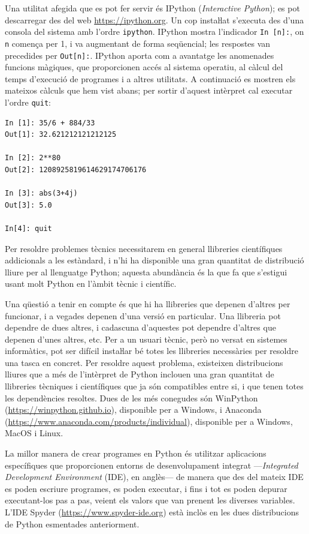 Una utilitat afegida que es pot fer servir és IPython (\textit{Interactive Python}); es pot descarregar des del web \href{https://ipython.org/}{https:/\!\!/ipython.org}. Un cop instaŀlat s'executa des d'una consola del sistema amb l'ordre \texttt{ipython}. IPython mostra l'indicador \texttt{In [n]:}, on \texttt{n} comença per 1, i va augmentant de forma seqüencial; les respostes van precedides per \texttt{Out[n]:}. IPython aporta com a avantatge les anomenades funcions màgiques, que proporcionen accés al sistema operatiu, al càlcul del temps d'execució de programes i a altres utilitats. A continuació es mostren els mateixos càlculs que hem vist abans; per sortir d'aquest intèrpret cal executar l'ordre \texttt{quit}:
\begin{lstlisting}
In [1]: 35/6 + 884/33
Out[1]: 32.621212121212125

In [2]: 2**80
Out[2]: 1208925819614629174706176

In [3]: abs(3+4j)
Out[3]: 5.0

In[4]: quit
\end{lstlisting}

Per resoldre problemes tècnics necessitarem en general llibreries científiques addicionals a les estàndard,  i n'hi ha disponible una gran quantitat de distribució lliure  per al llenguatge Python; aquesta abundància és la que fa que s'estigui usant molt Python en l'àmbit tècnic i científic.

Una qüestió a tenir en compte és que hi ha llibreries que depenen d'altres per funcionar, i a vegades  depenen d'una versió en particular. Una llibreria pot dependre de dues altres, i cadascuna d'aquestes pot dependre d'altres que depenen d'unes altres, etc. Per a un usuari tècnic, però no versat en sistemes informàtics, pot ser difícil instaŀlar bé totes les llibreries necessàries per resoldre una tasca en concret. Per resoldre aquest problema, existeixen distribucions lliures que a més de l'intèrpret de Python inclouen una gran quantitat de llibreries tècniques i científiques que ja són compatibles entre si, i que tenen totes les dependències resoltes. Dues de les més conegudes són WinPython (\href{https://winpython.github.io/}{https:/\!\!/winpython.github.io}), disponible  per a Windows, i
Anaconda (\href{https://www.anaconda.com/products/individual}{https:/\!\!/www.anaconda.com/products/individual}), disponible per a Windows, MacOS i Linux.



La millor manera de crear programes en Python és utilitzar aplicacions específiques que proporcionen entorns  de desenvolupament integrat ---\textit{Integrated Development Environment} (IDE), en anglès--- de manera que des del mateix IDE es poden escriure programes, es poden executar, i fins i tot es poden depurar executant-los pas a pas, veient els valors que van prenent les diverses variables. L'IDE Spyder (\href{https://www.spyder-ide.org/}{https:/\!\!/www.spyder-ide.org}) està inclòs en les dues distribucions de Python esmentades anteriorment. 

